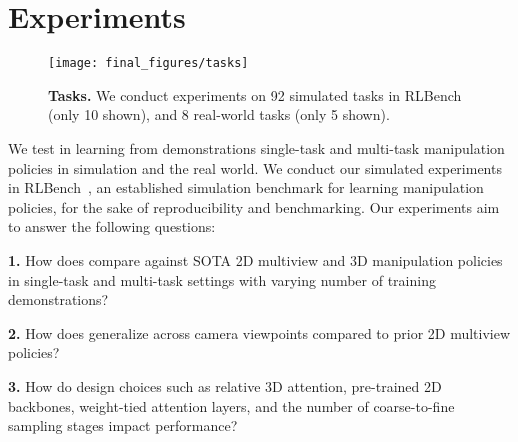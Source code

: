 \vspace{-0.05in}
\section{Experiments}
\label{sec:experiments}
\begin{figure}
\begin{adjustbox}{center}
    \texttt{[image: final\_figures/tasks]}
    \end{adjustbox}
    \caption{\textbf{Tasks.} We conduct experiments on 92 simulated tasks in RLBench \cite{james2020rlbench} (only 10 shown), and 8 real-world tasks (only 5 shown). }
    \label{fig:tasks}
\end{figure}

We test \model{} in learning from demonstrations single-task and multi-task manipulation policies in simulation and the real world. 
We conduct our simulated experiments in  RLBench~\cite{james2020rlbench}, an established simulation benchmark for learning manipulation policies, for the sake of reproducibility and benchmarking. 
Our experiments aim to answer the following questions:

\textbf{1.} How does \model{} compare against SOTA 2D multiview and 3D manipulation policies in  single-task and multi-task settings with varying number of training demonstrations?

\textbf{2.} How does \model{} generalize across camera viewpoints compared to prior 2D multiview policies?

\textbf{3.} How do design choices such as relative 3D attention, pre-trained 2D backbones, weight-tied attention layers, and the number of coarse-to-fine sampling stages impact performance?





